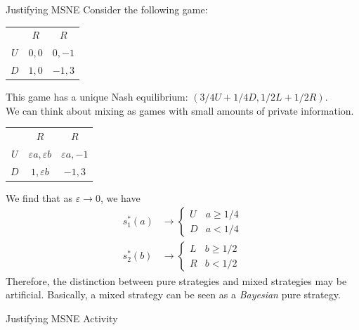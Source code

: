 \documentclass[10pt]{extarticle}
\begin{document}
  \begin{problem}{Justifying MSNE}
    Consider the following game:
    \begin{center}
      \renewcommand{\arraystretch}{1.5}
      \begin{tabular}{c|c|c|}
        \multicolumn{1}{c}{} & \multicolumn{1}{c}{$R$} & \multicolumn{1}{c}{$R$}\\
        \cline{2-3}
        $U$ & $0,0$ & $0,-1$\\
        \cline{2-3}
        $D$ & $1,0$ & $-1,3$\\
        \cline{2-3}
      \end{tabular}
    \end{center}
    This game has a unique Nash equilibrium: $(3/4U + 1/4D, 1/2L + 1/2R)$.\\

    We can think about mixing as games with small amounts of private information.
    \begin{center}
      \renewcommand{\arraystretch}{1.5}
      \begin{tabular}{c|c|c|}
        \multicolumn{1}{c}{} & \multicolumn{1}{c}{$R$} & \multicolumn{1}{c}{$R$}\\
        \cline{2-3}
        $U$ & $\varepsilon a, \varepsilon b$ & $\varepsilon a,-1$\\
        \cline{2-3}
        $D$ & $1,\varepsilon b$ & $-1,3$\\
        \cline{2-3}
      \end{tabular}
    \end{center}
    We find that as $\varepsilon\rightarrow 0$, we have
    \begin{align*}
      s_1^{\ast}(a) &\rightarrow \begin{cases}
        U & a\geq 1/4\\
        D & a < 1/4
      \end{cases}\\
        s_2^{\ast}(b) &\rightarrow \begin{cases}
          L & b \geq 1/2\\
          R & b<1/2
        \end{cases}
    \end{align*}
    Therefore, the distinction between pure strategies and mixed strategies may be artificial. Basically, a mixed strategy can be seen as a \textit{Bayesian} pure strategy.
  \end{problem}
  \begin{problem}{Justifying MSNE Activity}
    \begin{tcbraster}[raster columns = 1, sharp corners, colframe = black!75!white,colback=white]
    \end{tcbraster}
  \end{problem}
\end{document}
